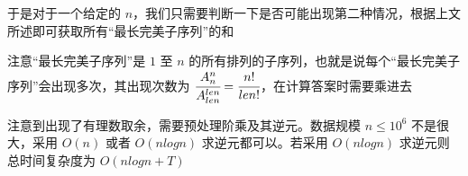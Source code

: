 \documentclass{pptt}
\begin{document}
\begin{frame}
    于是对于一个给定的 $n$，我们只需要判断一下是否可能出现第二种情况，根据上文所述即可获取所有“最长完美子序列”的和

    注意“最长完美子序列”是 $1$ 至 $n$ 的所有排列的子序列，也就是说每个“最长完美子序列”会出现多次，其出现次数为 $\cfrac{A_n^n}{A_{len}^{len}}=\cfrac{n!}{len!}$，在计算答案时需要乘进去

    注意到出现了有理数取余，需要预处理阶乘及其逆元。数据规模 $n \leq {10}^6$ 不是很大，采用 $O(n)$ 或者 $O(nlogn)$ 求逆元都可以。若采用 $O(nlogn)$ 求逆元则总时间复杂度为 $O(nlogn+T)$
\end{frame}
\end{document}
